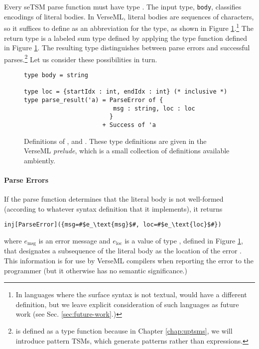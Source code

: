Every seTSM parse function must have type . The input type, \lstinline{body}, classifies encodings of literal {bodies}. In VerseML, literal bodies are sequences of characters, so it suffices to define  as an abbreviation for the  type, as shown in Figure \ref{fig:indexrange-and-parseresult}.\footnote{In languages where the surface syntax is not textual,  would have a different definition, but we leave explicit consideration of such languages as future work (see Sec. \ref{sec:future-work}.)} The return type is a labeled sum type defined by applying the type function  defined in Figure \ref{fig:indexrange-and-parseresult}. The resulting type distinguishes between parse errors and successful parses.\footnote{ is defined as a type function because in Chapter \ref{chap:uptsms}, we will introduce pattern TSMs, which generate patterns rather than expressions.} Let us consider these possibilities in turn.
\begin{figure}
\begin{lstlisting}[numbers=none]
type body = string

type loc = {startIdx : int, endIdx : int} (* inclusive *)
type parse_result('a) = ParseError of {
                         msg : string, loc : loc
                        }
                      + Success of 'a 
\end{lstlisting}
\caption[Definitions of ,  and  in VerseML]{Definitions of ,  and . These type definitions are given in the VerseML \emph{prelude}, which is a small collection of definitions available ambiently.}
\label{fig:indexrange-and-parseresult}
\end{figure}

\paragraph{Parse Errors} If the parse function determines that the literal body is not well-formed (according to whatever syntax definition that it implements), it returns
\begin{lstlisting}[numbers=none]
inj[ParseError]({msg=#$e_\text{msg}$#, loc=#$e_\text{loc}$#})
\end{lstlisting}
where $e_\text{msg}$ is an error message and $e_\text{loc}$ is a value of type , defined in Figure \ref{fig:indexrange-and-parseresult}, that designates a subsequence of the literal body as the location of the error \cite{DBLP:journals/jsc/DeursenKT93}. This information is for use by VerseML compilers when reporting the error to the programmer (but it otherwise has no semantic significance.)

